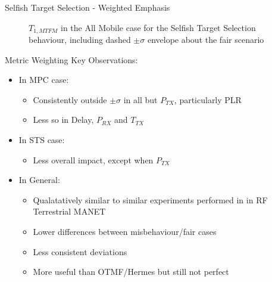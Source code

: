 \documentclass{beamer}
\begin{document}
\begin{frame}{Selfish Target Selection - Weighted Emphasis}
\begin{figure}[h]
\caption{$T_{1,MTFM}$ in the All Mobile case for the Selfish Target Selection behaviour, including dashed $\pm\sigma$ envelope about the fair scenario\hyperlink{fig:selfish_emph_closeup}{}}
 
\label{fig:all_mobile_selfish}
\end{figure}
\end{frame}

\begin{frame}{Metric Weighting}
  Key Observations:
  \begin{itemize}
    \item In MPC case:
      \begin{itemize}
        \item Consistently outside $\pm\sigma$ in all but $P_{TX}$, particularly PLR
        \item Less so in Delay, $P_{RX}$ and $T_{TX}$
      \end{itemize}
    \item In STS case:
      \begin{itemize}
        \item Less overall impact, except when $P_{TX}$
      \end{itemize}

    \item In General:
      \begin{itemize}
        \item Qualatatively similar to similar experiments performed in \cite{Guo11} in RF Terrestrial MANET
        \item Lower differences between misbehaviour/fair cases
        \item Less consistent deviations
        \item More useful than OTMF/Hermes but still not perfect
      \end{itemize}
  \end{itemize}

\end{frame}
\end{document}
